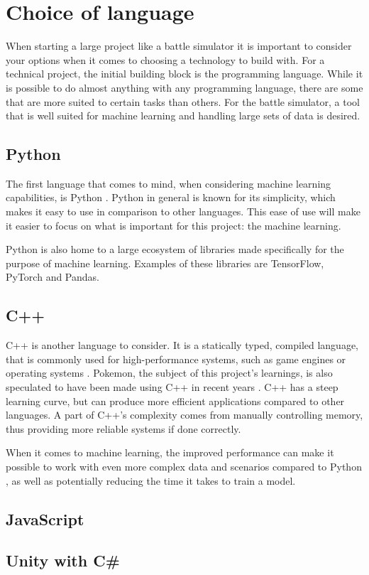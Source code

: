 \section{Choice of language}
\label{sec:choice-of-language}

When starting a large project like a battle simulator it is important to consider your options when it comes to choosing a technology to build with.
For a technical project, the initial building block is the programming language. While it is possible to do almost anything with any 
programming language, there are some that are more suited to certain tasks than others. For the battle simulator, a tool that is well 
suited for machine learning and handling large sets of data is desired.

\subsection{Python}
The first language that comes to mind, when considering machine learning capabilities, is Python \cite{PythonForMachineLearning}.
Python in general is known for its simplicity, which makes it easy to use in comparison to other languages. This ease of use will make it
easier to focus on what is important for this project: the machine learning.

Python is also home to a large ecosystem of libraries made specifically for the purpose of machine learning. Examples of these libraries are
TensorFlow, PyTorch and Pandas.


\subsection{C++}
C++ is another language to consider. It is a statically typed, compiled language, that is commonly used for high-performance systems, such as
game engines or operating systems \cite{C++}. Pokemon, the subject of this project's learnings, is also speculated to have been made using C++ in recent years \cite{PokemonProgrammingLanguageForumPost}\cite{NintendoDataLeak}\cite{ChatGPTPokemonProgrammingLanguage}.
C++ has a steep learning curve, but can produce more efficient applications compared to other languages. 
A part of C++'s complexity comes from manually controlling memory, thus providing more reliable systems if done correctly. 

When it comes to machine learning, the improved performance can make it possible to work with even more complex data and scenarios compared 
to Python \cite{C++VsPythonML}, as well as potentially reducing the time it takes to train a model. 

\subsection{JavaScript}
\subsection{Unity with C\#}
